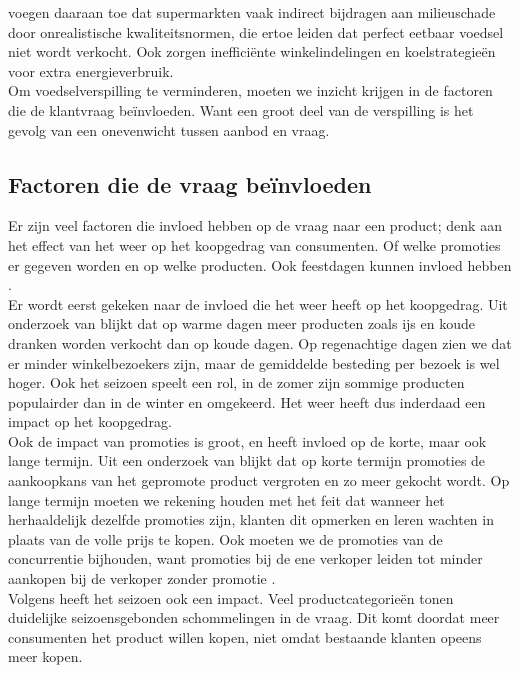 \documentclass{hogent-article}
\begin{document}
    \textcite{Teller2018a} voegen daaraan toe dat supermarkten vaak indirect bijdragen aan milieuschade door onrealistische kwaliteitsnormen, die ertoe leiden dat perfect eetbaar voedsel niet wordt verkocht. Ook zorgen inefficiënte winkelindelingen en koelstrategieën voor extra energieverbruik.\\
    
    Om voedselverspilling te verminderen, moeten we inzicht krijgen in de factoren die de klantvraag beïnvloeden. Want een groot deel van de verspilling is het gevolg van een onevenwicht tussen aanbod en vraag.
    
    \subsection{Factoren die de vraag beïnvloeden}
    
    Er zijn veel factoren die invloed hebben op de vraag naar een product; denk aan het effect van het weer op het koopgedrag van consumenten. Of welke promoties er gegeven worden en op welke producten. Ook feestdagen kunnen invloed hebben \autocite{Liu2021}.\\
    
    Er wordt eerst gekeken naar de invloed die het weer heeft op het koopgedrag. Uit onderzoek van \textcite{Liu2021} blijkt dat op warme dagen meer producten zoals ijs en koude dranken worden verkocht dan op koude dagen. Op regenachtige dagen zien we dat er minder winkelbezoekers zijn, maar de gemiddelde besteding per bezoek is wel hoger. Ook het seizoen speelt een rol, in de zomer zijn sommige producten populairder dan in de winter en omgekeerd. Het weer heeft dus inderdaad een impact op het koopgedrag.\\
    
    Ook de impact van promoties is groot, en heeft invloed op de korte, maar ook lange termijn. Uit een onderzoek van \textcite{Zhang2017} blijkt dat op korte termijn promoties de aankoopkans van het gepromote product vergroten en zo meer gekocht wordt. Op lange termijn moeten we rekening houden met het feit dat wanneer het herhaaldelijk dezelfde promoties zijn, klanten dit opmerken en leren wachten in plaats van de volle prijs te kopen. Ook moeten we de promoties van de concurrentie bijhouden, want promoties bij de ene verkoper leiden tot minder aankopen bij de verkoper zonder promotie \autocite{Zhang2017}.\\
    
    Volgens \textcite{Sacks2022} heeft het seizoen ook een impact. Veel productcategorieën tonen duidelijke seizoensgebonden schommelingen in de vraag. Dit komt doordat meer consumenten het product willen kopen, niet omdat bestaande klanten opeens meer kopen.\\
    
\end{document}
